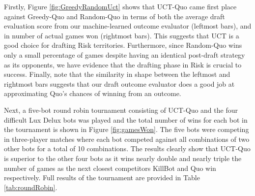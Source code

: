 \documentclass[letterpaper]{article}
\numberwithin{equation}{section}
\numberwithin{theorem}{section}
\numberwithin{lemma}{section}
\numberwithin{df}{section}
\begin{document}
Firstly, Figure \ref{fig:GreedyRandomUct} shows that UCT-Quo came first place against Greedy-Quo and Random-Quo in terms of both the average draft evaluation score from our machine-learned outcome evaluator (leftmost bars), and in number of actual games won (rightmost bars).  This suggests that UCT is a good choice for drafting Risk territories.  Furthermore, since Random-Quo wins only a small percentage of games despite having an identical post-draft strategy as its opponents, we have evidence that the drafting phase in Risk is crucial to success.  Finally, note that the similarity in shape between the leftmost and rightmost bars suggests that our draft outcome evaluator does a good job at approximating Quo's chances of winning from an outcome. 

Next, a five-bot round robin tournament consisting of UCT-Quo and the four difficult Lux Delux bots was played and the total number of wins for each bot in the tournament is shown in Figure \ref{fig:gamesWon}.  The five bots were competing in three-player matches where each bot competed against all combinations of two other bots for a total of 10 combinations.  The results clearly show that UCT-Quo is superior to the other four bots as it wins nearly double and nearly triple the number of games as the next closest competitors KillBot and Quo win respectively.  Full results of the tournament are provided in Table \ref{tab:roundRobin}.
\end{document}
